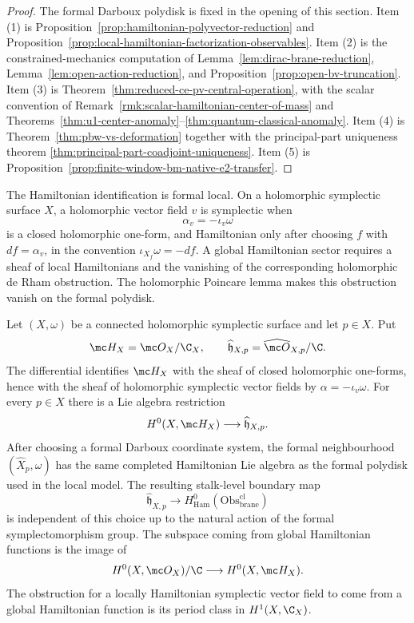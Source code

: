 \documentclass[11pt]{memoir}
\begin{document}
\begin{proof}
  The formal Darboux polydisk is fixed in the opening of this
  section.  Item (1) is
  Proposition~\ref{prop:hamiltonian-polyvector-reduction} and
  Proposition~\ref{prop:local-hamiltonian-factorization-observables}.
  Item (2) is the constrained-mechanics computation of
  Lemma~\ref{lem:dirac-brane-reduction},
  Lemma~\ref{lem:open-action-reduction}, and
  Proposition~\ref{prop:open-bv-truncation}.  Item (3) is
  Theorem~\ref{thm:reduced-ce-pv-central-operation}, with the scalar
  convention of Remark~\ref{rmk:scalar-hamiltonian-center-of-mass} and
  Theorems~\ref{thm:u1-center-anomaly}--\ref{thm:quantum-classical-anomaly}.
  Item (4) is Theorem~\ref{thm:pbw-vs-deformation} together with the
  principal-part uniqueness theorem
  \ref{thm:principal-part-coadjoint-uniqueness}.  Item (5) is
  Proposition~\ref{prop:finite-window-bm-native-e2-transfer}.
\end{proof}

\begin{rmk}
  The Hamiltonian identification is formal local. On a holomorphic
  symplectic surface $X$, a holomorphic vector field $v$ is symplectic
  when
  $$\alpha_v=-\iota_v\omega$$
  is a closed holomorphic one-form, and Hamiltonian only after choosing
  $f$ with $df=\alpha_v$, in the convention $\iota_{X_f}\omega=-df$. A
  global Hamiltonian sector requires a sheaf of local Hamiltonians and
  the vanishing of the corresponding holomorphic de Rham obstruction.
  The holomorphic Poincare lemma makes this obstruction vanish on the
  formal polydisk.
\end{rmk}

\begin{prop}\label{prop:formal-local-global-restriction}
  Let $(X,\omega)$ be a connected holomorphic symplectic surface and let
  $p\in X$. Put
  $$\mc H_X=\mc O_X/\C_X,\qquad
    \widehat{\mathfrak h}_{X,p}=\widehat{\mc O}_{X,p}/\C.$$
  The differential identifies $\mc H_X$ with the sheaf of closed holomorphic
  one-forms, hence with the sheaf of holomorphic symplectic vector fields by
  $\alpha=-\iota_v\omega$. For every $p\in X$ there is a Lie algebra
  restriction
  $$H^0(X,\mc H_X)\longrightarrow\widehat{\mathfrak h}_{X,p}.$$
  After choosing a formal Darboux coordinate system, the formal
  neighbourhood $(\widehat X_p,\omega)$ has the same completed
  Hamiltonian Lie algebra as the formal polydisk used in the local model. The
  resulting stalk-level boundary map
  $$\widehat{\mathfrak h}_{X,p}\longrightarrow
    H^0_{\mathrm{Ham}}(\mathrm{Obs}^{\mathrm{cl}}_{\mathrm{brane}})$$
  is independent of this choice up to the natural action of the formal
  symplectomorphism group. The subspace coming from global Hamiltonian
  functions is the image of
  $$H^0(X,\mc O_X)/\C\longrightarrow H^0(X,\mc H_X).$$
  The obstruction for a locally Hamiltonian symplectic vector field to come
  from a global Hamiltonian function is its period class in $H^1(X,\C_X)$.
\end{prop}
\end{document}
